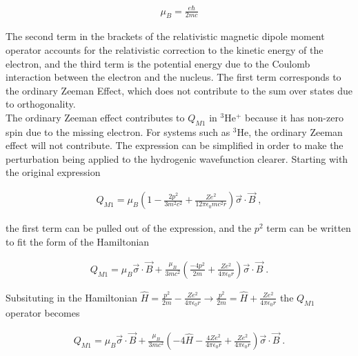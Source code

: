             \begin{align}
                \mu_B = \frac{e \hbar}{2mc}
            \end{align}

            \noindent The second term in the brackets of the relativistic magnetic dipole moment operator accounts for the relativistic correction to the kinetic energy of the electron, and the third term is the potential energy due to the Coulomb interaction between the electron and the nucleus. The first term corresponds to the ordinary Zeeman Effect, which does not contribute to the sum over states due to orthogonality.\\

            The ordinary Zeeman effect contributes to $Q_{M1}$ in $^3$He$^+$ because it has non-zero spin due to the missing electron. For systems such as $^3$He, the ordinary Zeeman effect will not contribute. The expression can be simplified in order to make the perturbation being applied to the hydrogenic wavefunction clearer. Starting with the original expression 

            \begin{align}
                Q_{M1} = \mu_B\left( 1 - \frac{2p^2}{3m^2c^2} + \frac{Ze^2}{12\pi \epsilon_0 mc^2 r} \right) \vec{\sigma} \cdot \vec{B}\;,
            \end{align}

            \noindent the first term can be pulled out of the expression, and the $p^2$ term can be written to fit the form of the Hamiltonian 

            \begin{align}
                Q_{M1} = \mu_B \vec{\sigma} \cdot \vec{B} + \frac{\mu_B}{3mc^2} \left( \frac{-4p^2}{2m} + \frac{Ze^2}{4\pi \epsilon_0 r} \right) \vec{\sigma} \cdot \vec{B}\;.
            \end{align}

            \noindent Subsituting in the Hamiltonian $\hat{H} = \frac{p^2}{2m} - \frac{Ze^2}{4\pi \epsilon_0 r} \longrightarrow \frac{p^2}{2m} = \hat{H} + \frac{Ze^2}{4\pi \epsilon_0 r}$ the $Q_{M1}$ operator becomes 

            \begin{align}
                Q_{M1} = \mu_B \vec{\sigma} \cdot \vec{B} + \frac{\mu_B}{3mc^2} \left( -4\hat{H} - \frac{4Ze^2}{4\pi \epsilon_0 r} + \frac{Ze^2}{4\pi \epsilon_0 r} \right) \vec{\sigma} \cdot \vec{B}\;.
            \end{align}

